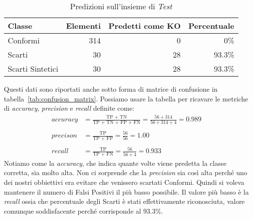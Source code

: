 \begin{table}[ht]
  \centering
  \begin{tabular}{||l r r r||}
    \hline
    Classe           & Elementi & Predetti come KO & Percentuale \\ \hline \hline
    Conformi         & 314      & 0                & 0\%         \\ \hline
    Scarti           & 30       & 28               & 93.3\%      \\ \hline
    Scarti Sintetici & 30       & 28               & 93.3\%      \\ \hline

  \end{tabular}
  \caption{Predizioni sull'insieme di \textit{Test}}
  \label{tab:test_predicions}
\end{table}

Questi dati sono riportati anche sotto forma di matrice di confusione in tabella~\ref{tab:confusion_matrix}.
Possiamo usare la tabella per ricavare le metriche di \textit{accuracy}, \textit{precision} e \textit{recall} definite come:
\begin{align*} %
  accuracy &= \frac{\text{TP + TN}}{\text{TP + TN + FP + FN}}
            = \frac{56 + 314}{56 + 314 + 4} = 0.989
  \\ \\
  precison &= \frac{\text{TP}}{\text{TP + FP}} 
            = \frac{56}{56} = 1.00
  \\ \\
  recall   &= \frac{\text{TP}}{\text{TP + FN}} 
            = \frac{56}{56 + 4} = 0.933
\end{align*}
Notiamo come la \textit{accuracy}, che indica quante volte viene predetta la classe corretta, sia molto alta.
Non ci sorprende che la \textit{precision} sia così alta perché uno dei nostri obbiettivi era evitare che venissero scartati Conformi.
Quindi si voleva mantenere il numero di Falsi Positivi il più basso possibile.
Il valore più basso è la \textit{recall} ossia che percentuale degli Scarti è stati effettivamente riconosciuta, valore comunque soddisfacente perché corrisponde al 93.3\%.

